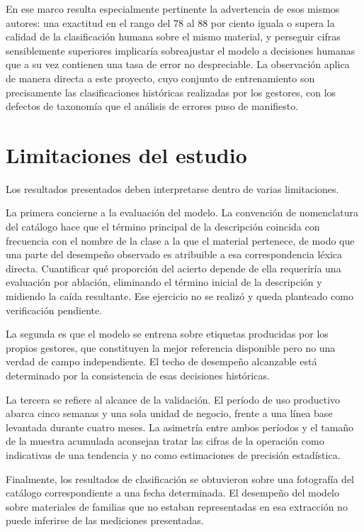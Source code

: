 En ese marco resulta especialmente pertinente la advertencia de esos mismos autores: una exactitud en el rango del 78 al 88 por ciento iguala o supera la calidad de la clasificación humana sobre el mismo material, y perseguir cifras sensiblemente superiores implicaría sobreajustar el modelo a decisiones humanas que a su vez contienen una tasa de error no despreciable. La observación aplica de manera directa a este proyecto, cuyo conjunto de entrenamiento son precisamente las clasificaciones históricas realizadas por los gestores, con los defectos de taxonomía que el análisis de errores puso de manifiesto.

\section{Limitaciones del estudio}
Los resultados presentados deben interpretarse dentro de varias limitaciones.

La primera concierne a la evaluación del modelo. La convención de nomenclatura del catálogo hace que el término principal de la descripción coincida con frecuencia con el nombre de la clase a la que el material pertenece, de modo que una parte del desempeño observado es atribuible a esa correspondencia léxica directa. Cuantificar qué proporción del acierto depende de ella requeriría una evaluación por ablación, eliminando el término inicial de la descripción y midiendo la caída resultante. Ese ejercicio no se realizó y queda planteado como verificación pendiente.

La segunda es que el modelo se entrena sobre etiquetas producidas por los propios gestores, que constituyen la mejor referencia disponible pero no una verdad de campo independiente. El techo de desempeño alcanzable está determinado por la consistencia de esas decisiones históricas.

La tercera se refiere al alcance de la validación. El período de uso productivo abarca cinco semanas y una sola unidad de negocio, frente a una línea base levantada durante cuatro meses. La asimetría entre ambos períodos y el tamaño de la muestra acumulada aconsejan tratar las cifras de la operación como indicativas de una tendencia y no como estimaciones de precisión estadística.

Finalmente, los resultados de clasificación se obtuvieron sobre una fotografía del catálogo correspondiente a una fecha determinada. El desempeño del modelo sobre materiales de familias que no estaban representadas en esa extracción no puede inferirse de las mediciones presentadas.

